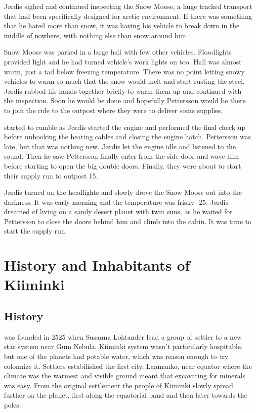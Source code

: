 \documentclass{tufte-book}
\begin{document}
J\o rdis sighed and continued inspecting the Snow Moose, a huge
tracked transport that had been specifically designed for arctic
environment. If there was something that he hated more than snow, it
was having his vehicle to break down in the middle of nowhere, with
nothing else than snow around him.

Snow Moose was parked in a large hall with few other vehicles.
Floodlights provided light and he had turned vehicle's work lights on
too. Hall was almost warm, just a tad below freezing temperature.
There was no point letting snowy vehicles to warm so much that the
snow would melt and start rusting the steel. J\o rdis rubbed his hands
together briefly to warm them up and continued with the inspection.
Soon he would be done and hopefully Pettersson would be there to
join the ride to the outpost where they were to deliver some
supplies.

 started to rumble as J\o rdis started the
engine and performed the final check up before unhooking the heating
cables and closing the engine hatch. Pettersson was late, but that was
nothing new. J\o rdis let the engine idle and listened to the sound.
Then he saw Pettersson finally enter from the side door and wave him
before starting to open the big double doors. Finally, they were about
to start their supply run to outpost 15.

J\o rdis turned on the headlights and slowly drove the Snow Moose out
into the darkness. It was early morning and the temperature was frisky
-25\celsius. J\o rdis dreamed of living on a sandy desert planet with
twin suns, as he waited for Pettersson to close the doors behind him 
and climb into the cabin. It was time to start the supply run.

\chapter{History and Inhabitants of Kiiminki}
\label{ch:history-and-inhabitants}

\section{History}
\label{sc:history}

 was founded in 2525 when Susanna Lohtander
lead a group of settler to a new star system near Gum Nebula. Kiiminki system
wasn't particularly hospitable, but one of the planets had potable water,
which was reason enough to try colonnize it. Settlers estabilished the first
city, Laamanko, near equator where the climate was the warmest and visible 
ground meant that excavating for minerals was easy. From the original
settlement the people of Kiiminki slowly spread further on the planet, first
along the equatorial band and then later towards the poles.
\end{document}
